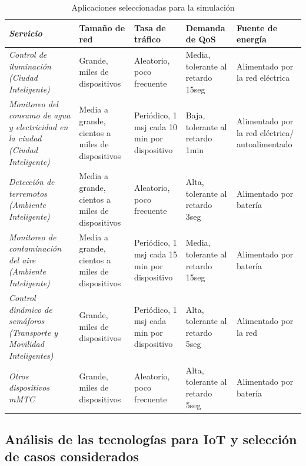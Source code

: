\begin{table}
\caption{Aplicaciones seleccionadas para la simulación}
\label{tab:appssim}
\centering
\begin{tabular}{*{5}{m{3cm}}} \\ 
\textbf{\textit{Servicio}} & \textbf{Tamaño de red} & \textbf{Tasa de tráfico} & \textbf{Demanda de QoS} & \textbf{Fuente de energía} \\ \hline \hline
\textit{Control de iluminación (Ciudad Inteligente)}  & \footnotesize{ Grande, miles de dispositivos } & \footnotesize{ Aleatorio, poco frecuente } & \footnotesize{ Media, tolerante al retardo 15seg } & \footnotesize{ Alimentado por la red eléctrica } \\ \hline 
\textit{Monitoreo del consumo de agua y electricidad en la ciudad (Ciudad Inteligente)}  & \footnotesize{ Media a grande, cientos a miles de dispositivos } & \footnotesize{ Periódico, 1 msj cada 10 min por dispositivo } & \footnotesize{ Baja, tolerante al retardo 1min } & \footnotesize{ Alimentado por la red eléctrica/ autoalimentado } \\ \hline 
\textit{Detección de terremotos (Ambiente Inteligente)}  & \footnotesize{ Media a grande, cientos a miles de dispositivos } & \footnotesize{ Aleatorio, poco frecuente } & \footnotesize{ Alta, tolerante al retardo 3seg } & \footnotesize{ Alimentado por batería } \\ \hline 
\textit{Monitoreo de contaminación del aire (Ambiente Inteligente) } & \footnotesize{ Media a grande, cientos a miles de dispositivos } & \footnotesize{ Periódico, 1 msj cada 15 min por dispositivo } & \footnotesize{ Media, tolerante al retardo 15seg } & \footnotesize{ Alimentado por batería } \\ \hline 
\textit{Control dinámico de semáforos (Transporte y Movilidad Inteligentes)} & \footnotesize{ Grande, miles de dispositivos } & \footnotesize{ Periódico, 1 msj cada min por dispositivo } & \footnotesize{ Alta, tolerante al retardo 5seg } & \footnotesize{ Alimentado por la red } \\ \hline 
\textit{Otros dispositivos mMTC}  & \footnotesize{ Grande, miles de dispositivos } & \footnotesize{ Aleatorio, poco frecuente } & \footnotesize{ Alta, tolerante al retardo 5seg } & \footnotesize{ Alimentado por batería } \\ 
\end{tabular}
\end{table}


\subsection{Análisis de las tecnologías para IoT y selección de casos considerados}

